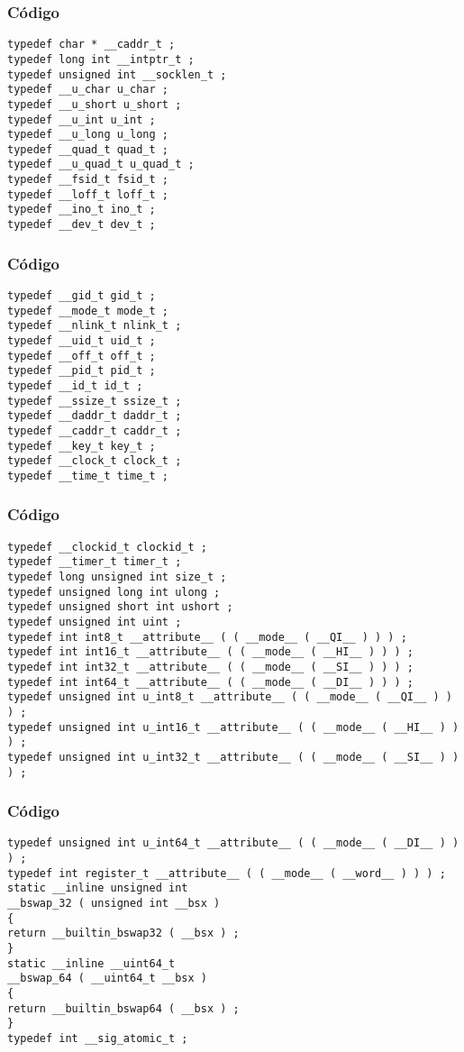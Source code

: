 \documentclass{beamer}
\begin{document}
\begin{frame}[fragile]
\frametitle{C\'odigo}
\begin{verbatim}
typedef char * __caddr_t ; 
typedef long int __intptr_t ; 
typedef unsigned int __socklen_t ; 
typedef __u_char u_char ; 
typedef __u_short u_short ; 
typedef __u_int u_int ; 
typedef __u_long u_long ; 
typedef __quad_t quad_t ; 
typedef __u_quad_t u_quad_t ; 
typedef __fsid_t fsid_t ; 
typedef __loff_t loff_t ; 
typedef __ino_t ino_t ; 
typedef __dev_t dev_t ; 
\end{verbatim}
\end{frame}
\begin{frame}[fragile]
\frametitle{C\'odigo}
\begin{verbatim}
typedef __gid_t gid_t ; 
typedef __mode_t mode_t ; 
typedef __nlink_t nlink_t ; 
typedef __uid_t uid_t ; 
typedef __off_t off_t ; 
typedef __pid_t pid_t ; 
typedef __id_t id_t ; 
typedef __ssize_t ssize_t ; 
typedef __daddr_t daddr_t ; 
typedef __caddr_t caddr_t ; 
typedef __key_t key_t ; 
typedef __clock_t clock_t ; 
typedef __time_t time_t ; 
\end{verbatim}
\end{frame}
\begin{frame}[fragile]
\frametitle{C\'odigo}
\begin{verbatim}
typedef __clockid_t clockid_t ; 
typedef __timer_t timer_t ; 
typedef long unsigned int size_t ; 
typedef unsigned long int ulong ; 
typedef unsigned short int ushort ; 
typedef unsigned int uint ; 
typedef int int8_t __attribute__ ( ( __mode__ ( __QI__ ) ) ) ; 
typedef int int16_t __attribute__ ( ( __mode__ ( __HI__ ) ) ) ; 
typedef int int32_t __attribute__ ( ( __mode__ ( __SI__ ) ) ) ; 
typedef int int64_t __attribute__ ( ( __mode__ ( __DI__ ) ) ) ; 
typedef unsigned int u_int8_t __attribute__ ( ( __mode__ ( __QI__ ) ) ) ; 
typedef unsigned int u_int16_t __attribute__ ( ( __mode__ ( __HI__ ) ) ) ; 
typedef unsigned int u_int32_t __attribute__ ( ( __mode__ ( __SI__ ) ) ) ; 
\end{verbatim}
\end{frame}
\begin{frame}[fragile]
\frametitle{C\'odigo}
\begin{verbatim}
typedef unsigned int u_int64_t __attribute__ ( ( __mode__ ( __DI__ ) ) ) ; 
typedef int register_t __attribute__ ( ( __mode__ ( __word__ ) ) ) ; 
static __inline unsigned int 
__bswap_32 ( unsigned int __bsx ) 
{ 
return __builtin_bswap32 ( __bsx ) ; 
} 
static __inline __uint64_t 
__bswap_64 ( __uint64_t __bsx ) 
{ 
return __builtin_bswap64 ( __bsx ) ; 
} 
typedef int __sig_atomic_t ; 
\end{verbatim}
\end{frame}
\end{document}
